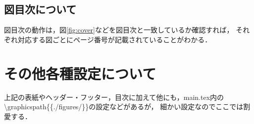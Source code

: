 \subsection{図目次について}
図目次の動作は，図\ref{fig:cover}などを図目次と一致しているか確認すれば，
それぞれ対応する図ごとにページ番号が記載されていることがわかる．


\section{その他各種設定について}
上記の表紙やヘッダー・フッター，目次に加えて他にも，main.tex内の
\textbackslash graphicspath\{\{./figures/\}\}の設定などがあるが，
細かい設定なのでここでは割愛する．
